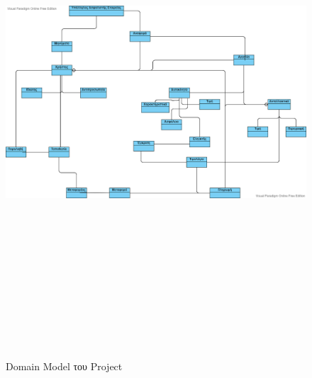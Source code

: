 \documentclass{../ol-softwaremanual}
\begin{document}
	\begin{figure}[htbp!]		
		\includegraphics[width=\textwidth+3cm, height=19cm]{img/Domain_model.png}
		\caption{\en Domain Model \gr του \en Project \gr}
	\end{figure}
	
	
	
	\newpage
	
	
\end{document}
